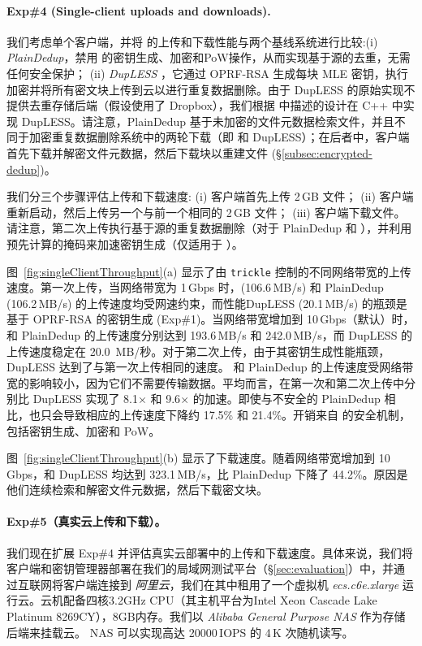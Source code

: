 \paragraph{Exp\#4 (Single-client uploads and downloads).} 我们考虑单个客户端，并将 \sysname 的上传和下载性能与两个基线系统进行比较:(i) \textit{ PlainDedup}，禁用 \sysname 的密钥生成、加密和PoW操作，从而实现基于源的去重，无需任何安全保护； (ii) \textit{ DupLESS} \cite{bellare13b}，它通过 OPRF-RSA 生成每块 MLE 密钥，执行加密并将所有密文块上传到云以进行重复数据删除。由于 DupLESS 的原始实现不提供去重存储后端（假设使用了 Dropbox），我们根据 \cite{bellare13b} 中描述的设计在 C++ 中实现 DupLESS。请注意，PlainDedup 基于未加密的文件元数据检索文件，并且不同于加密重复数据删除系统中的两轮下载（即 \sysname 和 DupLESS）；在后者中，客户端首先下载并解密文件元数据，然后下载块以重建文件 (\S\ref{subsec:encrypted-dedup})。

我们分三个步骤评估上传和下载速度: (i) 客户端首先上传 2\,GB 文件； (ii) 客户端重新启动，然后上传另一个与前一个相同的 2\,GB 文件； (iii) 客户端下载文件。请注意，第二次上传执行基于源的重复数据删除（对于 PlainDedup 和 \sysname），并利用预先计算的掩码来加速密钥生成（仅适用于 \sysname）。

图~\ref{fig:singleClientThroughput}(a) 显示了由 {\tt trickle} \cite{eriksen05} 控制的不同网络带宽的上传速度。第一次上传，当网络带宽为 1\,Gbps 时，\sysname (106.6\,MB/s) 和 PlainDedup (106.2\,MB/s) 的上传速度均受网速约束，而性能DupLESS (20.1\,MB/s) 的瓶颈是基于 OPRF-RSA 的密钥生成 (Exp\#1)。当网络带宽增加到 10\,Gbps（默认）时，\sysname 和 PlainDedup 的上传速度分别达到 193.6\,MB/s 和 242.0\,MB/s，而 DupLESS 的上传速度稳定在 20.0\, MB/秒。对于第二次上传，由于其密钥生成性能瓶颈，DupLESS 达到了与第一次上传相同的速度。 \sysname 和 PlainDedup 的上传速度受网络带宽的影响较小，因为它们不需要传输数据。平均而言，\sysname 在第一次和第二次上传中分别比 DupLESS 实现了 8.1$\times$ 和 9.6$\times$ 的加速。即使与不安全的 PlainDedup 相比，\sysname 也只会导致相应的上传速度下降约 17.5\% 和 21.4\%。开销来自 \sysname 的安全机制，包括密钥生成、加密和 PoW。

图~\ref{fig:singleClientThroughput}(b) 显示了下载速度。随着网络带宽增加到 10\,Gbps，\sysname 和 DupLESS 均达到 323.1\,MB/s，比 PlainDedup 下降了 44.2\%。原因是他们连续检索和解密文件元数据，然后下载密文块。

\paragraph{Exp\#5（真实云上传和下载）。} 我们现在扩展 Exp\#4 并评估真实云部署中的上传和下载速度。具体来说，我们将客户端和密钥管理器部署在我们的局域网测试平台（\S\ref{sec:evaluation}）中，并通过互联网将客户端连接到\textit{ 阿里云}，我们在其中租用了一个虚拟机\textit{ ecs.c6e.xlarge} 运行云。云机配备四核3.2GHz CPU（其主机平台为Intel Xeon Cascade Lake Platinum 8269CY），8GB内存。我们以 \textit{ Alibaba General Purpose NAS} 作为存储后端来挂载云。 NAS 可以实现高达 20000\,IOPS 的 4\,K 次随机读写。

